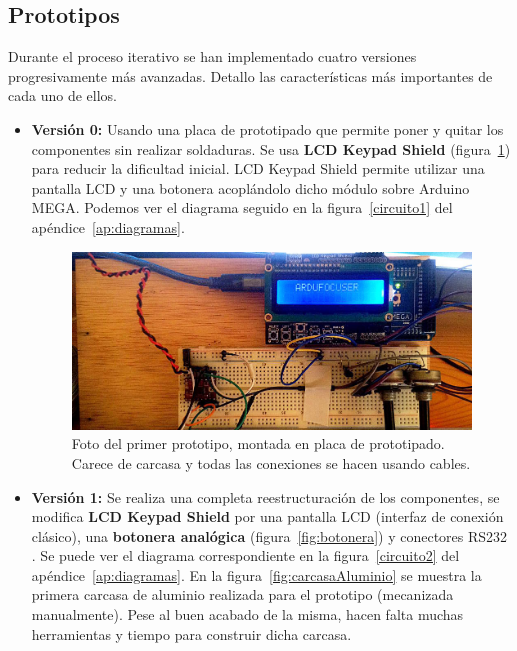 \begin{itemize}
\subsection{Prototipos}

Durante el proceso iterativo se han implementado cuatro versiones progresivamente más avanzadas. Detallo las características más importantes de cada uno de ellos.

\begin{itemize}
	\item \textbf{Versión 0:} Usando una placa de prototipado que permite poner y quitar los componentes sin realizar soldaduras. Se usa \textbf{LCD Keypad Shield} \cite{lcd_keypad} (figura~\ref{fig:foto_prototipo}) para reducir la dificultad inicial. LCD Keypad Shield permite utilizar una pantalla LCD y una botonera acoplándolo dicho módulo sobre Arduino MEGA. Podemos ver el diagrama seguido en la figura~\ref{circuito1} del apéndice~\ref{ap:diagramas}. 
	
	\begin{figure}
		\centering
		\includegraphics[width=1\linewidth]{../images/proto_recorte}
		\caption[Foto del primer prototipo]{Foto del primer prototipo, montada en placa de prototipado. Carece de carcasa y todas las conexiones se hacen usando cables.}
		\label{fig:foto_prototipo}
	\end{figure}
	
	
	\item \textbf{Versión 1:} Se realiza una completa reestructuración de los componentes, se modifica  \textbf{LCD Keypad Shield} por una pantalla LCD (interfaz de conexión clásico), una \textbf{botonera analógica} (figura~\ref{fig:botonera}) y conectores RS232 \cite{rs232}. Se puede ver el diagrama correspondiente en la figura~\ref{circuito2} del apéndice~\ref{ap:diagramas}. En la figura~\ref{fig:carcasaAluminio} se muestra la primera carcasa de aluminio realizada para el prototipo (mecanizada manualmente). Pese al buen acabado de la misma, hacen falta muchas herramientas y tiempo para construir dicha carcasa.
	

\end{itemize}
\end{itemize}
